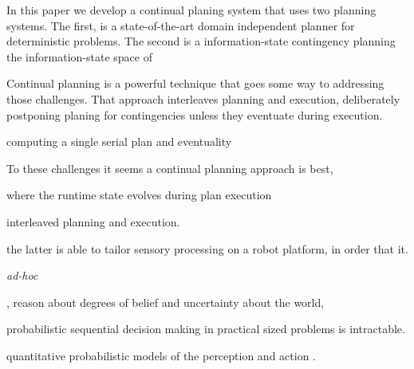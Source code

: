 \documentclass[letterpaper]{article}
\begin{document}
In this paper we develop a continual planing system that uses two
planning systems. The first, is a state-of-the-art domain independent
planner for deterministic problems. The second is a information-state
contingency planning the information-state space of 


Continual planning is a powerful technique that goes some way to
addressing those challenges. That approach interleaves planning and
execution, deliberately postponing planing for contingencies unless
they eventuate during execution. 


computing a single serial plan and
eventuality



To these challenges it seems a continual planning approach is best, 

where the runtime state evolves during plan execution 


interleaved planning and execution. 

the latter is able to tailor sensory processing on a robot platform,
in order that it.

{\em ad-hoc} 

, reason about degrees of belief and uncertainty about the world, 

probabilistic sequential decision making in practical sized problems
is intractable.

quantitative probabilistic models of the perception and action .




\end{document}

